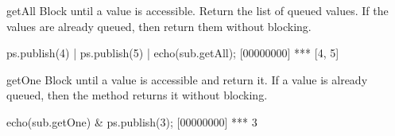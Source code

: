 \begin{urbiscriptapi}
\item[getAll] Block until a value is accessible.  Return the list of
  queued values.  If the values are already queued, then return them
  without blocking.

\begin{urbiscript}
ps.publish(4) |
ps.publish(5) |
echo(sub.getAll);
[00000000] *** [4, 5]
\end{urbiscript}


\item[getOne]
  Block until a value is accessible and return it.  If a value is already
  queued, then the method returns it without blocking.

\begin{urbiscript}
echo(sub.getOne) &
ps.publish(3);
[00000000] *** 3
\end{urbiscript}


\end{urbiscriptapi}

